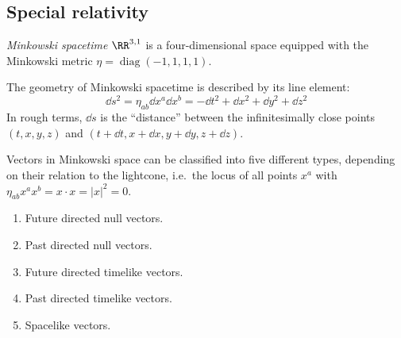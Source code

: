 \documentclass{jknotes} %
\begin{document}
\subsection{Special relativity}

\begin{defn}
    \emph{Minkowski spacetime} \(\RR^{3,1}\) is a four-dimensional space equipped with the Minkowski metric \(\eta = \operatorname{diag}(-1,1,1,1)\).
\end{defn}

The geometry of Minkowski spacetime is described by its line element:
\begin{equation}
    \dd{s^2} = \eta_{ab} \dd{x^a} \dd{x^b} = -\dd{t^2}+\dd{x^2}+\dd{y^2}+\dd{z^2}
\end{equation}
In rough terms, \(\dd{s}\) is the ``distance'' between the infinitesimally close points \((t,x,y,z)\) and \((t+\dd{t},x+\dd{x},y+\dd{y},z+\dd{z})\).

Vectors in Minkowski space can be classified into five different types, depending on their relation to the lightcone, i.e.\ the locus of all points \(x^a\) with \(\eta_{ab}x^ax^b = x \cdot x = |x|^2 = 0\).

\begin{minipage}{0.39\linewidth}
    \begin{figure}[H]
        \raggedleft
    \end{figure}
\end{minipage}
\begin{minipage}{0.6\linewidth}
    \begin{enumerate}
        \item Future directed null vectors.
        \item Past directed null vectors.
        \item Future directed timelike vectors.
        \item Past directed timelike vectors.
        \item Spacelike vectors.
    \end{enumerate}
\end{minipage}
\end{document}
